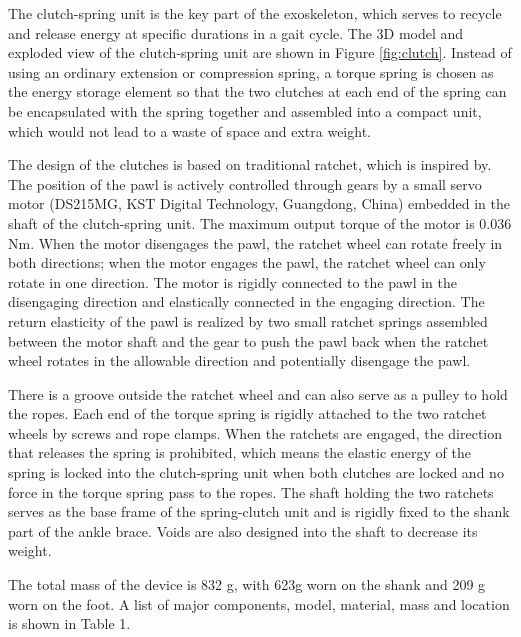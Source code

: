 \documentclass[twocolumn,cleanfoot,10pt]{asme2ej}
\begin{document}
The clutch-spring unit is the key part of the exoskeleton, which serves to recycle and release energy at specific durations in a gait cycle. The 3D model and exploded view of the clutch-spring unit are shown in Figure \ref{fig:clutch}. Instead of using an ordinary extension or compression spring, a torque spring is chosen as the energy storage element so that the two clutches at each end of the spring can be encapsulated with the spring together and assembled into a compact unit, which would not lead to a waste of space and extra weight. 

The design of the clutches is based on traditional ratchet, which is inspired by\cite{RN19}. The position of the pawl is actively controlled through gears by a small servo motor (DS215MG, KST Digital Technology, Guangdong, China) embedded in the shaft of the clutch-spring unit. The maximum output torque of the motor is 0.036 Nm. When the motor disengages the pawl, the ratchet wheel can rotate freely in both directions; when the motor engages the pawl, the ratchet wheel can only rotate in one direction. The motor is rigidly connected to the pawl in the disengaging direction and elastically connected in the engaging direction. The return elasticity of the pawl is realized by two small ratchet springs assembled between the motor shaft and the gear to push the pawl back when the ratchet wheel rotates in the allowable direction and potentially disengage the pawl.

There is a groove outside the ratchet wheel and can also serve as a pulley to hold the ropes. Each end of the torque spring is rigidly attached to the two ratchet wheels by screws and rope clamps. When the ratchets are engaged, the direction that releases the spring is prohibited, which means the elastic energy of the spring is locked into the clutch-spring unit when both clutches are locked and no force in the torque spring pass to the ropes. The shaft holding the two ratchets serves as the base frame of the spring-clutch unit and is rigidly fixed to the shank part of the ankle brace. Voids are also designed into the shaft to decrease its weight.

The total mass of the device is 832 g, with 623g worn on the shank and 209 g worn on the foot. A list of major components, model, material, mass and location is shown in
Table 1.  

\end{document}
